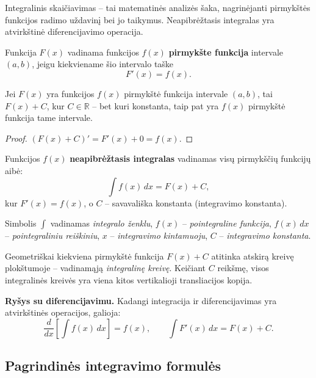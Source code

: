 Integralinis skaičiavimas – tai matematinės analizės šaka, nagrinėjanti pirmykštės funkcijos radimo uždavinį bei jo taikymus. Neapibrėžtasis integralas yra atvirkštinė diferencijavimo operacija.

\begin{definition}
Funkcija $F(x)$ vadinama funkcijos $f(x)$ \textbf{pirmykšte funkcija} intervale $(a,b)$, jeigu kiekviename šio intervalo taške
\[
F'(x) = f(x).
\]
\end{definition}

\begin{theorem}
Jei $F(x)$ yra funkcijos $f(x)$ pirmykštė funkcija intervale $(a,b)$, tai $F(x) + C$, kur $C \in \mathbb{R}$ – bet kuri konstanta, taip pat yra $f(x)$ pirmykštė funkcija tame intervale.
\end{theorem}

\begin{proof}
$(F(x)+C)' = F'(x) + 0 = f(x)$.
\end{proof}

\begin{definition}
Funkcijos $f(x)$ \textbf{neapibrėžtasis integralas} vadinamas visų pirmykščių funkcijų aibė:
\[
\int f(x)\,dx = F(x) + C,
\]
kur $F'(x)=f(x)$, o $C$ – savavališka konstanta (integravimo konstanta).
\end{definition}

\begin{remark}
Simbolis $\int$ vadinamas \emph{integralo ženklu}, $f(x)$ – \emph{pointegraline funkcija}, $f(x)\,dx$ – \emph{pointegraliniu reiškiniu}, $x$ – \emph{integravimo kintamuoju}, $C$ – \emph{integravimo konstanta}.
\end{remark}

Geometriškai kiekviena pirmykštė funkcija $F(x)+C$ atitinka atskirą kreivę plokštumoje – vadinamąją \emph{integralinę kreivę}. Keičiant $C$ reikšmę, visos integralinės kreivės yra viena kitos vertikalioji transliacijos kopija.

\textbf{Ryšys su diferencijavimu.} Kadangi integracija ir diferencijavimas yra atvirkštinės operacijos, galioja:
\[
\frac{d}{dx}\left[\int f(x)\,dx\right] = f(x), \qquad \int F'(x)\,dx = F(x)+C.
\]

\subsection{Pagrindinės integravimo formulės}

